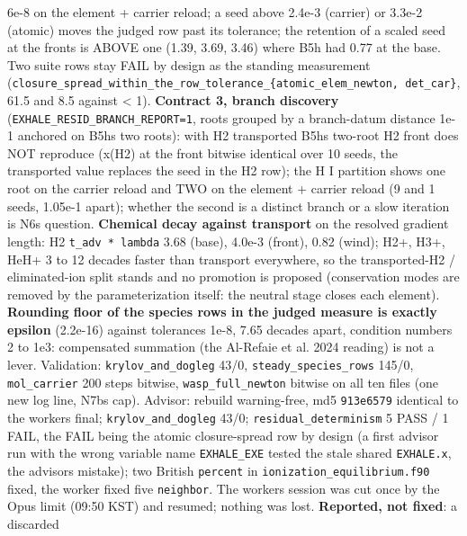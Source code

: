 \documentclass[english,a4paper]{my_memo}
\begin{document}
\begin{itemize}
  6e-8 on the element + carrier reload; a seed above 2.4e-3 (carrier) or
  3.3e-2 (atomic) moves the judged row past its tolerance; the retention of
  a scaled seed at the fronts is ABOVE one (1.39, 3.69, 3.46) where B5h had
  0.77 at the base. Two suite rows stay FAIL by design as the standing
  measurement (\texttt{closure\_spread\_within\_the\_row\_tolerance\_\{atomic\_elem\_newton,\ det\_car\}}, 61.5 and 8.5 against \textless{} 1). \textbf{Contract 3, branch discovery}
  (\texttt{EXHALE\_RESID\_BRANCH\_REPORT=1}, roots grouped by a branch-datum distance
  1e-1 anchored on B5h\textquotesingle s two roots): with H2 transported B5h\textquotesingle s two-root H2
  front does NOT reproduce (x(H2) at the front bitwise identical over 10
  seeds, the transported value replaces the seed in the H2 row); the H I
  partition shows one root on the carrier reload and TWO on the element +
  carrier reload (9 and 1 seeds, 1.05e-1 apart); whether the second is a
  distinct branch or a slow iteration is N6\textquotesingle s question. \textbf{Chemical decay
  against transport} on the resolved gradient length: H2 \texttt{t\_adv\ *\ lambda}
  3.68 (base), 4.0e-3 (front), 0.82 (wind); H2+, H3+, HeH+ 3 to 12 decades
  faster than transport everywhere, so the transported-H2 / eliminated-ion
  split stands and no promotion is proposed (conservation modes are removed
  by the parameterization itself: the neutral stage closes each element).
  \textbf{Rounding floor of the species rows in the judged measure is exactly
  epsilon} (2.2e-16) against tolerances 1e-8, 7.65 decades apart, condition
  numbers 2 to 1e3: compensated summation (the Al-Refaie et al. 2024
  reading) is not a lever. Validation: \texttt{krylov\_and\_dogleg} 43/0,
  \texttt{steady\_species\_rows} 145/0, \texttt{mol\_carrier} 200 steps bitwise,
  \texttt{wasp\_full\_newton} bitwise on all ten files (one new log line, N7b\textquotesingle s cap).
  Advisor: rebuild warning-free, md5 \texttt{913e6579} identical to the worker\textquotesingle s
  final; \texttt{krylov\_and\_dogleg} 43/0; \texttt{residual\_determinism} 5 PASS / 1 FAIL,
  the FAIL being the atomic closure-spread row by design (a first advisor
  run with the wrong variable name \texttt{EXHALE\_EXE} tested the stale shared
  \texttt{EXHALE.x}, the advisor\textquotesingle s mistake); two British \texttt{percent} in
  \texttt{ionization\_equilibrium.f90} fixed, the worker fixed five \texttt{neighbor}.
  The worker\textquotesingle s session was cut once by the Opus limit (09:50 KST) and
  resumed; nothing was lost. \textbf{Reported, not fixed}: a discarded

\end{itemize}
\end{document}
